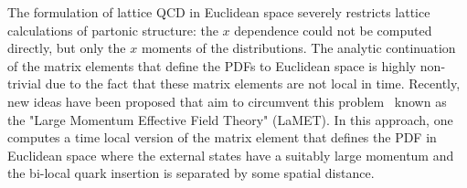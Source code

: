 
The formulation of lattice QCD in Euclidean space severely restricts
lattice calculations of partonic structure: the $x$ dependence could not be computed directly, but
only the $x$ moments of the distributions.  
The analytic continuation of the matrix elements that define the PDFs to Euclidean space is highly non-trivial due to the fact that these matrix elements are not local in time. Recently, new ideas have
been proposed that aim to circumvent this
problem~\cite{Ji:2013dva,Ji:2014gla} known as the "Large Momentum Effective Field Theory" (LaMET).
In this approach, one computes a time local version of the matrix element that defines the PDF in Euclidean space
where the external states have a suitably large momentum  and the
bi-local quark insertion is separated by some spatial distance.


